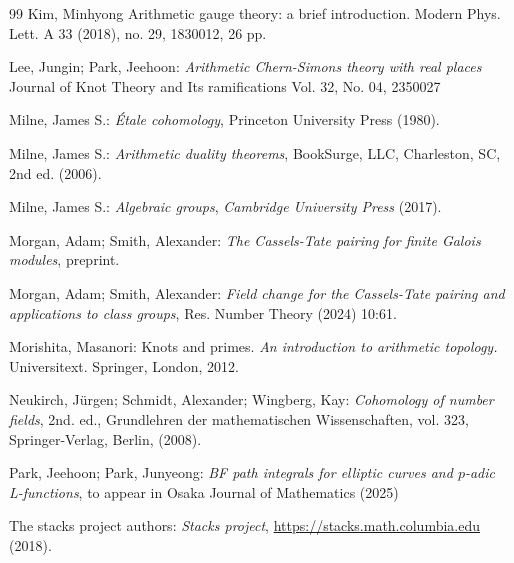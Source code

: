 \documentclass[a4paper]{amsart}
\theoremstyle{definition}
\numberwithin{equation}{section}
\begin{document}
\begin{thebibliography}{99}
{Kim, Minhyong Arithmetic gauge theory: a brief introduction. Modern Phys. Lett. A 33 (2018), no. 29, 1830012, 26 pp. }



 Lee, Jungin; Park, Jeehoon: \emph{Arithmetic Chern-Simons theory with real places} Journal of Knot Theory and Its ramifications Vol. 32, No. 04, 2350027

 Milne, James S.: \emph{\'Etale cohomology}, Princeton University Press (1980).

 Milne, James S.: \emph{Arithmetic duality theorems}, BookSurge, LLC, Charleston, SC, 2nd ed. (2006).

 Milne, James S.: \emph{Algebraic groups}, \emph{Cambridge University Press} (2017).

 Morgan, Adam; Smith, Alexander: \emph{The Cassels-Tate pairing for finite Galois modules}, preprint.

 Morgan, Adam; Smith, Alexander: \emph{Field change for the Cassels-Tate pairing and applications to class groups}, Res. Number Theory (2024) 10:61.


Morishita, Masanori: Knots and primes. \emph{An introduction to arithmetic topology.} Universitext. Springer, London, 2012.

 Neukirch, J\"urgen; Schmidt, Alexander; Wingberg, Kay: \emph{Cohomology of number fields}, 2nd. ed., Grundlehren der mathematischen Wissenschaften, vol. 323, Springer-Verlag, Berlin, (2008).

 Park, Jeehoon; Park, Junyeong: \emph{ BF path integrals for elliptic curves and $p$-adic L-functions}, to appear in Osaka Journal of Mathematics (2025)

 The stacks project authors: \emph{Stacks project}, \url{https://stacks.math.columbia.edu} (2018).
\end{thebibliography}
\end{document}
